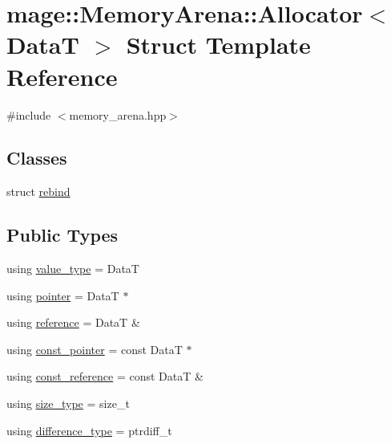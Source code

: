 \hypertarget{structmage_1_1_memory_arena_1_1_allocator}{}\section{mage\+:\+:Memory\+Arena\+:\+:Allocator$<$ DataT $>$ Struct Template Reference}
\label{structmage_1_1_memory_arena_1_1_allocator}


{\ttfamily \#include $<$memory\+\_\+arena.\+hpp$>$}

\subsection*{Classes}
\begin{DoxyCompactItemize}
\item 
struct \hyperlink{structmage_1_1_memory_arena_1_1_allocator_1_1rebind}{rebind}
\end{DoxyCompactItemize}
\subsection*{Public Types}
\begin{DoxyCompactItemize}
\item 
using \hyperlink{structmage_1_1_memory_arena_1_1_allocator_a6ae3ef840bd738889b2c4136294a4f6d}{value\+\_\+type} = DataT
\item 
using \hyperlink{structmage_1_1_memory_arena_1_1_allocator_a06c19054bb02d7e7c982434c47f19adf}{pointer} = DataT $\ast$
\item 
using \hyperlink{structmage_1_1_memory_arena_1_1_allocator_afeac56ef7ef38b63f56161988f59ef32}{reference} = DataT \&
\item 
using \hyperlink{structmage_1_1_memory_arena_1_1_allocator_a3b15a7f2d3fd22fb2626b335f15d5e17}{const\+\_\+pointer} = const DataT $\ast$
\item 
using \hyperlink{structmage_1_1_memory_arena_1_1_allocator_a22e7c887e2578fb0cd253a6d7404ac1b}{const\+\_\+reference} = const DataT \&
\item 
using \hyperlink{structmage_1_1_memory_arena_1_1_allocator_ae9b21f77ba4d93a7c8f5ed3097bd6f8e}{size\+\_\+type} = size\+\_\+t
\item 
using \hyperlink{structmage_1_1_memory_arena_1_1_allocator_ab9c65276a085579673b0e77efe64fdee}{difference\+\_\+type} = ptrdiff\+\_\+t
\end{DoxyCompactItemize}
